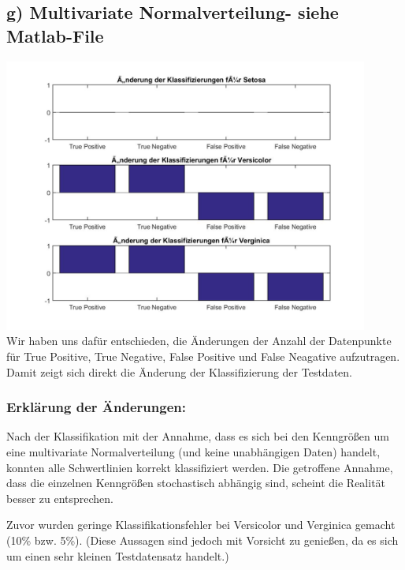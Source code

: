 \documentclass{scrartcl}
\begin{document}

\subsection*{g) Multivariate Normalverteilung- siehe Matlab-File}

\includegraphics[width=0.9\textwidth]{plots/diffsAll.jpg} \\

Wir haben uns dafür entschieden, die Änderungen der Anzahl der Datenpunkte für True Positive, True Negative, False Positive und False Neagative aufzutragen.\\
Damit zeigt sich direkt die Änderung der Klassifizierung der Testdaten.

\subsubsection*{Erklärung der Änderungen:}

Nach der Klassifikation mit der Annahme, dass es sich bei den Kenngrößen um eine multivariate Normalverteilung (und keine unabhängigen Daten) handelt, konnten alle Schwertlinien korrekt klassifiziert werden.
Die getroffene Annahme, dass die einzelnen Kenngrößen stochastisch abhängig sind, scheint die Realität besser zu entsprechen.

Zuvor wurden geringe Klassifikationsfehler  bei Versicolor und Verginica gemacht (10\% bzw. 5\%). (Diese Aussagen sind jedoch mit Vorsicht zu genießen, da es sich um einen sehr kleinen Testdatensatz handelt.)
\end{document}
